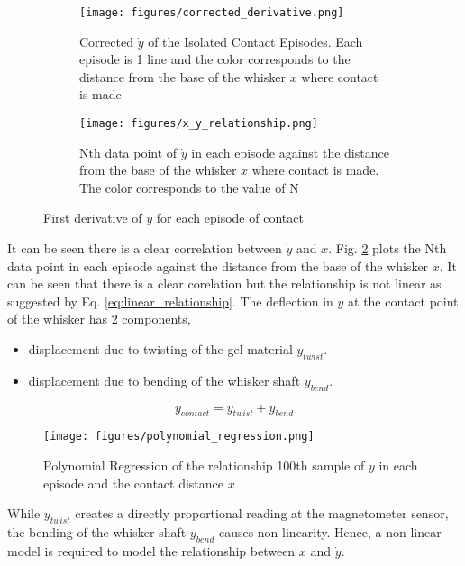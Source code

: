 \documentclass[runningheads]{llncs}
\begin{document}
\begin{figure}
    \centering
    \begin{subfigure}[t]{.48\textwidth}
        \centering
        \texttt{[image: figures/corrected\_derivative.png]}
        \caption{Corrected \(\dot{y}\) of the Isolated Contact Episodes. Each episode is 1 line and the color corresponds to the distance from the base of the whisker \(x\) where contact is made}
        \label{fig:corrected_derivative.png}
    \end{subfigure}
    \hspace{1mm}
    \begin{subfigure}[t]{.48\textwidth}
        \centering
        \texttt{[image: figures/x\_y\_relationship.png]}
        \caption{Nth data point of \(\dot{y}\) in each episode against the distance from the base of the whisker \(x\) where contact is made. The color corresponds to the value of N}
        \label{fig:x_y_relationship.png}
    \end{subfigure}
    \caption{First derivative of \(y\) for each episode of contact}
    \label{fig:episode_analysis}
\end{figure}

It can be seen there is a clear correlation between \(\dot{y}\) and \(x\). Fig. \ref*{fig:x_y_relationship.png} plots the Nth data point in each episode against the distance from the base of the whisker \(x\). It can be seen that there is a clear corelation but the relationship is not linear as suggested by Eq. \ref*{eq:linear_relationship}. The deflection in \(y\) at the contact point of the whisker has 2 components,
\begin{itemize}
    \item displacement due to twisting of the gel material \(y_{twist}\).
    \item displacement due to bending of the whisker shaft \(y_{bend}\).
\end{itemize}
\[y_{contact} = y_{twist} + y_{bend}\]

\begin{wrapfigure}{r}{.5\textwidth}
    \centering
    \texttt{[image: figures/polynomial\_regression.png]}
    \caption{Polynomial Regression of the relationship 100th sample of \(\dot{y}\) in each episode and the contact distance \(x\)}
    \label{fig:polynomial_regression.png}
\end{wrapfigure}

While \(y_{twist}\) creates a directly proportional reading at the magnetometer sensor, the bending of the whisker shaft \(y_{bend}\) causes non-linearity. Hence, a non-linear model is required to model the relationship between \(x\) and \(\dot{y}\).
\end{document}
